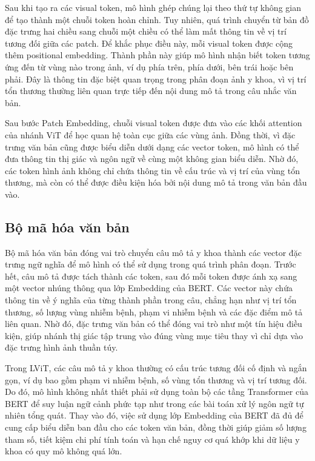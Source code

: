 Sau khi tạo ra các visual token, mô hình ghép chúng lại theo thứ tự không gian để tạo thành một chuỗi token hoàn chỉnh. Tuy nhiên, quá trình chuyển từ bản đồ đặc trưng hai chiều sang chuỗi một chiều có thể làm mất thông tin về vị trí tương đối giữa các patch. Để khắc phục điều này, mỗi visual token được cộng thêm positional embedding. Thành phần này giúp mô hình nhận biết token tương ứng đến từ vùng nào trong ảnh, ví dụ phía trên, phía dưới, bên trái hoặc bên phải. Đây là thông tin đặc biệt quan trọng trong phân đoạn ảnh y khoa, vì vị trí tổn thương thường liên quan trực tiếp đến nội dung mô tả trong câu nhắc văn bản.

Sau bước Patch Embedding, chuỗi visual token được đưa vào các khối attention của nhánh ViT để học quan hệ toàn cục giữa các vùng ảnh. Đồng thời, vì đặc trưng văn bản cũng được biểu diễn dưới dạng các vector token, mô hình có thể đưa thông tin thị giác và ngôn ngữ về cùng một không gian biểu diễn. Nhờ đó, các token hình ảnh không chỉ chứa thông tin về cấu trúc và vị trí của vùng tổn thương, mà còn có thể được điều kiện hóa bởi nội dung mô tả trong văn bản đầu vào.

\subsection{Bộ mã hóa văn bản}

Bộ mã hóa văn bản đóng vai trò chuyển câu mô tả y khoa thành các vector đặc trưng ngữ nghĩa để mô hình có thể sử dụng trong quá trình phân đoạn. Trước hết, câu mô tả được tách thành các token, sau đó mỗi token được ánh xạ sang một vector nhúng thông qua lớp Embedding của BERT. Các vector này chứa thông tin về ý nghĩa của từng thành phần trong câu, chẳng hạn như vị trí tổn thương, số lượng vùng nhiễm bệnh, phạm vi nhiễm bệnh và các đặc điểm mô tả liên quan. Nhờ đó, đặc trưng văn bản có thể đóng vai trò như một tín hiệu điều kiện, giúp nhánh thị giác tập trung vào đúng vùng mục tiêu thay vì chỉ dựa vào đặc trưng hình ảnh thuần túy.

Trong LViT, các câu mô tả y khoa thường có cấu trúc tương đối cố định và ngắn gọn, ví dụ bao gồm phạm vi nhiễm bệnh, số vùng tổn thương và vị trí tương đối. Do đó, mô hình không nhất thiết phải sử dụng toàn bộ các tầng Transformer của BERT để suy luận ngữ cảnh phức tạp như trong các bài toán xử lý ngôn ngữ tự nhiên tổng quát. Thay vào đó, việc sử dụng lớp Embedding của BERT đã đủ để cung cấp biểu diễn ban đầu cho các token văn bản, đồng thời giúp giảm số lượng tham số, tiết kiệm chi phí tính toán và hạn chế nguy cơ quá khớp khi dữ liệu y khoa có quy mô không quá lớn.


